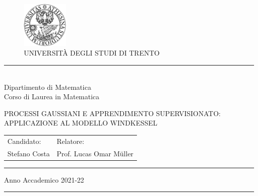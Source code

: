 

\begin{figure}[H]
\centering
\includegraphics[width=0.2\textwidth]{images/Logo.png}\\
\Large UNIVERSITÀ DEGLI STUDI DI TRENTO
\end{figure}

\vspace{-0.67cm}

\setlength{\parskip}{-12pt} %
\begin{center}
\noindent\rule{0.78\textwidth}{1pt}\\
\vspace{0.1cm}
\large Dipartimento di Matematica\\
\vspace{0.5cm}
\large Corso di Laurea  in Matematica
\end{center}

\vspace{3 cm} %


\begin{center}
{\fontsize{20}{30} \selectfont PROCESSI GAUSSIANI E APPRENDIMENTO SUPERVISIONATO: APPLICAZIONE AL MODELLO WINDKESSEL\par} %
\end{center}


\vspace{6 cm} %


\begin{large}
\begin{tabular}{m{7cm}l}
Candidato: & Relatore:\\
Stefano Costa & Prof. Lucas Omar Müller
\end{tabular}
\end{large}


\vfill %

\setlength{\parskip}{-18pt} %
\noindent\rule{\textwidth}{1pt}
\begin{center}
{Anno Accademico 2021-22}
\end{center}
\noindent\rule{\textwidth}{1pt}
\setlength{\parskip}{0pt} %